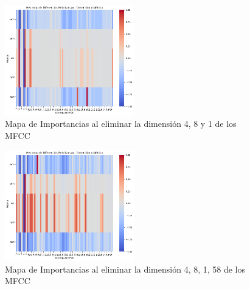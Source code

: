 \documentclass[conference]{IEEEtran}
\begin{document}
\begin{figure}[h]
\centering
\includegraphics[width=0.5\textwidth]{images/importance_plot_no_dims_4-8-1.png}
\caption{Mapa de Importancias al eliminar la dimensión 4, 8 y 1 de los MFCC}
\end{figure}

\begin{figure}[h]
\centering
\includegraphics[width=0.5\textwidth]{images/importance_plot_no_dims_4-8-1-58.png}
\caption{Mapa de Importancias al eliminar la dimensión 4, 8, 1, 58 de los MFCC}
\end{figure}
\end{document}
